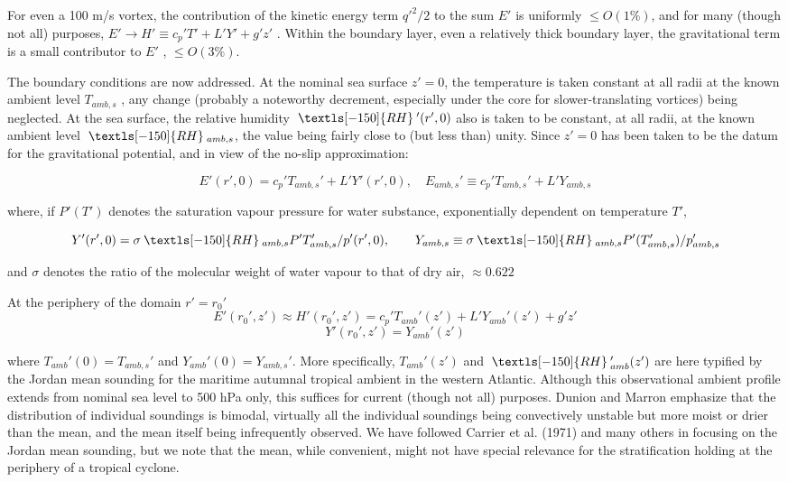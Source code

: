 \documentclass[preprint, prX]{revtex4}
\newcommand{\rh}{\:\textls[-150]{RH}\:}
\begin{document}
For even a 100 m/s vortex, the contribution of the kinetic energy term $q'^2 /2$ to the sum $E'$ is uniformly $\leq O(1 \%)$, and for many (though not all) purposes, $E' \rightarrow H' \equiv c_p' T'+L' Y' +g' z'$ . Within the boundary layer, even a relatively thick boundary layer, the gravitational term is a small contributor to $E'$ , $\leq O(3 \%)$.

The boundary conditions are now addressed. At the nominal sea surface $z'=0$, the temperature is taken constant at all radii at the known ambient level $T_{amb,s}$ , any change (probably a noteworthy decrement, especially under the core for slower-translating vortices) being neglected. At the sea surface, the relative humidity $\rh'(r', 0)$ also is taken to be constant, at all radii, at the known  ambient level $\rh_{amb,s}$, the value being fairly close to (but less than) unity. Since $z'=0$ has been taken to be the datum for the gravitational potential, and in view of the no-slip approximation:

\begin{equation}
E'(r',0) = c_p' T_{amb,s}' + L' Y'(r',0), \quad E_{amb,s}' \equiv c_p'T_{amb,s}' + L' Y_{amb,s}
\end{equation}

where, if $P'(T')$ denotes the saturation vapour pressure for water substance, exponentially dependent on temperature $T'$,

\begin{equation}
Y'(r',0) = \sigma \rh_{amb,s} P'T_{amb,s}'/p'(r',0), \qquad Y_{amb,s}\equiv \sigma \rh_{amb,s}P'(T_{amb,s}')/p_{amb,s}'
\end{equation}

and $\sigma$ denotes the ratio of the molecular weight of water vapour to that of dry air, $\approx 0.622$

At the periphery of the domain $r '= r_0'$
\begin{equation}
E'(r_0',z')\approx H'(r_0',z') = c_p'T_{amb}'(z') + L' Y_{amb}'(z') + g'z'
\end{equation}
\begin{equation}
Y'(r_0', z') = Y_{amb}'(z')
\end{equation}

where $T_{amb}'(0) = T_{amb,s}'$ and $Y_{amb}'(0) = Y_{amb,s}'$. More specifically, $T_{amb}'(z')$ and $\rh_{amb}'(z')$ are here typified by the Jordan mean sounding for the maritime autumnal tropical ambient in the western Atlantic. Although this observational ambient profile extends from nominal sea level to 500 hPa only, this suffices for current (though not all) purposes. Dunion and Marron emphasize that the distribution of individual soundings is bimodal, virtually all the individual soundings being convectively unstable but more moist or drier than the mean, and the mean itself being infrequently observed. We have followed Carrier et al. (1971) and many others in focusing on the Jordan mean sounding, but we note that the mean, while convenient, might not have special relevance for the stratification holding at the periphery of a tropical cyclone.
\end{document}
